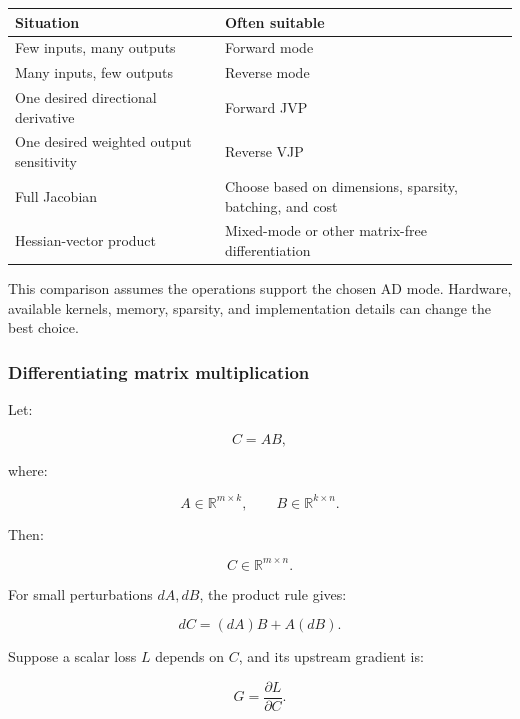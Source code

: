 {\def\LTcaptype{none} %
\begin{longtable}[]{@{}
  >{\raggedright\arraybackslash}p{}
  >{\raggedright\arraybackslash}p{}@{}}
\toprule\noalign{}
\begin{minipage}[b]{\linewidth}\raggedright
Situation
\end{minipage} & \begin{minipage}[b]{\linewidth}\raggedright
Often suitable
\end{minipage} \\
\midrule\noalign{}
\endhead
\bottomrule\noalign{}
\endlastfoot
Few inputs, many outputs & Forward mode \\
Many inputs, few outputs & Reverse mode \\
One desired directional derivative & Forward JVP \\
One desired weighted output sensitivity & Reverse VJP \\
Full Jacobian & Choose based on dimensions, sparsity, batching, and cost \\
Hessian-vector product & Mixed-mode or other matrix-free differentiation \\
\end{longtable}
}

This comparison assumes the operations support the chosen AD mode. Hardware, available kernels, memory, sparsity, and implementation details can change the best choice.

\subsubsection{Differentiating matrix multiplication}\label{02-foundations-ii-ch022-differentiating-matrix-multiplication}

Let:

\[
C=AB,
\]

where:

\[
A\in\mathbb R^{m\times k},\qquad B\in\mathbb R^{k\times n}.
\]

Then:

\[
C\in\mathbb R^{m\times n}.
\]

For small perturbations \(dA,dB\), the product rule gives:

\[
\boxed{ dC=(dA)B+A(dB) }.
\]

Suppose a scalar loss \(L\) depends on \(C\), and its upstream gradient is:

\[
G=\frac{\partial L}{\partial C}.
\]

